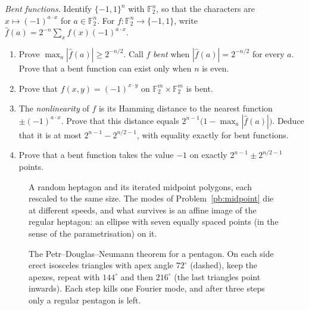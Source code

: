 \begin{exercise}[$\star\star$]\label{pb:bent}
\emph{Bent functions.} Identify $\{-1,1\}^n$ with $\mathbb F_2^n$, so that the characters are $x\mapsto(-1)^{a\cdot x}$ for $a\in\mathbb F_2^n$. For $f:\mathbb F_2^n\to\{-1,1\}$, write $\hat f(a)=2^{-n}\sum_x f(x)(-1)^{a\cdot x}$.
\begin{enumerate}[label=(\alph*)]
\item Prove $\max_a|\hat f(a)|\ge2^{-n/2}$. Call $f$ \emph{bent} when $|\hat f(a)|=2^{-n/2}$ for every $a$. Prove that a bent function can exist only when $n$ is even.
\item Prove that $f(x,y)=(-1)^{x\cdot y}$ on $\mathbb F_2^m\times\mathbb F_2^m$ is bent.
\item The \emph{nonlinearity} of $f$ is its Hamming distance to the nearest function $\pm(-1)^{a\cdot x}$. Prove that this distance equals $2^{n-1}\bigl(1-\max_a|\hat f(a)|\bigr)$. Deduce that it is at most $2^{n-1}-2^{n/2-1}$, with equality exactly for bent functions.
\item Prove that a bent function takes the value $-1$ on exactly $2^{n-1}\pm2^{n/2-1}$ points.
\end{enumerate}
\end{exercise}

\begin{figure}[ht]
\centering
{}
\caption{A random heptagon and its iterated midpoint polygons, each rescaled to the same size. The modes of
Problem~\ref{pb:midpoint} die at different speeds, and what survives is an affine image of the regular heptagon: an ellipse
with seven equally spaced points (in the sense of the parametrisation) on it.}
\label{fig:midpoint}
\end{figure}

\begin{figure}[ht]
\centering
{}
\caption{The Petr--Douglas--Neumann theorem for a pentagon. On each side erect isosceles triangles with apex angle $72^\circ$
(dashed), keep the apexes, repeat with $144^\circ$ and then $216^\circ$ (the last triangles point inwards). Each step kills
one Fourier mode, and after three steps only a regular pentagon is left.}
\label{fig:pdn}
\end{figure}


